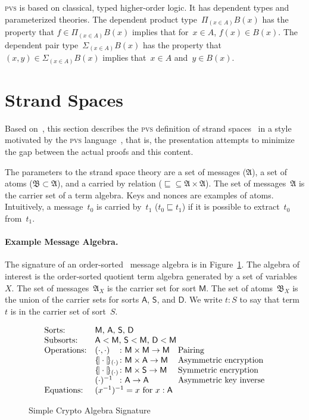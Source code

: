 \documentclass[12pt]{article}
\newcommand{\pvs}{\textsc{pvs}}
\newcommand{\srt}[1]{\ensuremath{\mathsf{#1}}}
\newcommand{\typ}{\mathbin:}
\newcommand{\enc}[2]{\ensuremath{\{\!|#1|\!\}_{#2}}}
\newcommand{\dprod}[1]{\Pi_{(#1)}}
\newcommand{\dpair}[1]{\Sigma_{(#1)}}
\newcommand{\alg}[1]{\ensuremath{\mathfrak{#1}}}
\newcommand{\msg}{\alg{A}}
\newcommand{\atm}{\alg{B}}
\begin{document}
{\pvs} is based on classical, typed higher-order
logic.  It has dependent types and parameterized theories.
The dependent product type~$\dprod{x\in A}B(x)$ has the property that
$f\in\dprod{x\in A}B(x)$ implies that for~$x\in A$, $f(x)\in B(x)$.
The dependent pair type~$\dpair{x\in A}B(x)$ has the property that
$(x,y)\in\dpair{x\in A}B(x)$ implies that~$x\in A$ and~$y\in B(x)$.

\section{Strand Spaces}\label{sec:strand spaces}

Based on~\cite{cpsaspec09}, this section describes the {\pvs}
definition of strand spaces~\cite{ThayerHerzogGuttman99} in a style
motivated by the {\pvs} language~\cite{cade92-pvs}, that is, the
presentation attempts to minimize the gap between the actual proofs
and this content.

The parameters to the strand space theory are a set of messages
(\msg), a set of atoms ($\atm\subset\msg$), and a carried by relation
(${\sqsubseteq}\subseteq\msg\times\msg$).  The set of messages~{\msg}
is the carrier set of a term algebra.  Keys and nonces are examples of
atoms.  Intuitively, a message~$t_0$ is carried by~$t_1$
($t_0\sqsubseteq t_1$) if it is possible to extract~$t_0$ from~$t_1$.

\paragraph{Example Message Algebra.}

The signature of an order-sorted~\cite{GoguenMeseguer92} message
algebra is in Figure~\ref{fig:signature}.  The algebra of interest is
the order-sorted quotient term algebra generated by a set of
variables~$X$.  The set of messages~$\msg_X$ is the carrier set for
sort \srt{M}.  The set of atoms~$\atm_X$ is the union of the carrier
sets for sorts \srt{A}, \srt{S}, and \srt{D}.  We write $t\typ S$ to
say that term~$t$ is in the carrier set of sort~$S$.

\begin{figure}
$$\begin{array}{ll@{{}\colon{}}ll}
\mbox{Sorts:}&
\multicolumn{3}{l}{\mbox{\srt{M}, \srt{A}, \srt{S}, \srt{D}}}\\
\mbox{Subsorts:}&
\multicolumn{3}{l}{\mbox{$\srt{A}<\srt{M}$, $\srt{S}<\srt{M}$,
    $\srt{D}<\srt{M}$}}\\
\mbox{Operations:}&(\cdot,\cdot)&\srt{M}\times\srt{M}\to\srt{M}
&\mbox{Pairing}\\
&\enc{\cdot}{(\cdot)}&\srt{M}\times\srt{A}\to\srt{M}
&\mbox{Asymmetric encryption}\\
&\enc{\cdot}{(\cdot)}&\srt{M}\times\srt{S}\to\srt{M}
&\mbox{Symmetric encryption}\\
&(\cdot)^{-1}&\srt{A}\to\srt{A}
&\mbox{Asymmetric key inverse}\\
\mbox{Equations:}&\multicolumn{3}{l}{(x^{-1})^{-1}=x\mbox{ for $x:\srt{A}$}}
\end{array}$$
\caption{Simple Crypto Algebra Signature}\label{fig:signature}
\end{figure}
\end{document}
